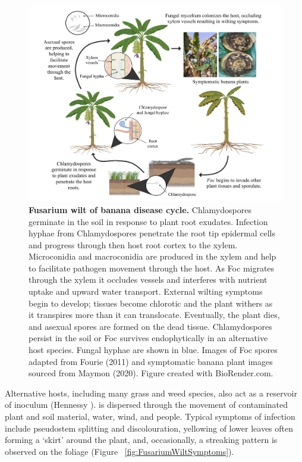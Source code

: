 \begin{figure}[hp!]
    \centering
    \includegraphics[width=14cm]{Figures/MyLifeCylceNarrow.pdf}
    \caption[Fusarium wilt of banana disease cycle.]{\textbf{Fusarium wilt of banana disease cycle.} Chlamydospores germinate in the soil in response to plant root exudates. Infection hyphae from Chlamydospores penetrate the root tip epidermal cells and progress through then host root cortex to the xylem. Microconidia and macroconidia are produced in the xylem and help to facilitate pathogen movement through the host. As Foc migrates through the xylem it occludes vessels and interferes with nutrient uptake and upward water transport. External wilting symptoms begin to develop; tissues become chlorotic and the plant withers as it transpires more than it can translocate. Eventually, the plant dies, and asexual spores are formed on the dead tissue. Chlamydospores persist in the soil or Foc survives endophytically in an alternative host species. Fungal hyphae are shown in blue. Images of Foc spores adapted from Fourie \et  (2011) and symptomatic banana plant images sourced from Maymon \et  (2020). Figure created with BioRender.com.}
    \label{fig:MyLifeCylce.}
\end{figure}


Alternative hosts, including many grass and weed species, also act as a reservoir of inoculum (Hennessy ).  \Foc is dispersed through the movement of contaminated plant and soil material, water, wind, and people. Typical symptoms of \Foc infection include pseudostem splitting and discolouration, yellowing of lower leaves often forming a ‘skirt’ around the plant, and, occasionally, a streaking pattern is observed on the foliage (Figure ~\ref{fig:FusariumWiltSymptoms}). 

